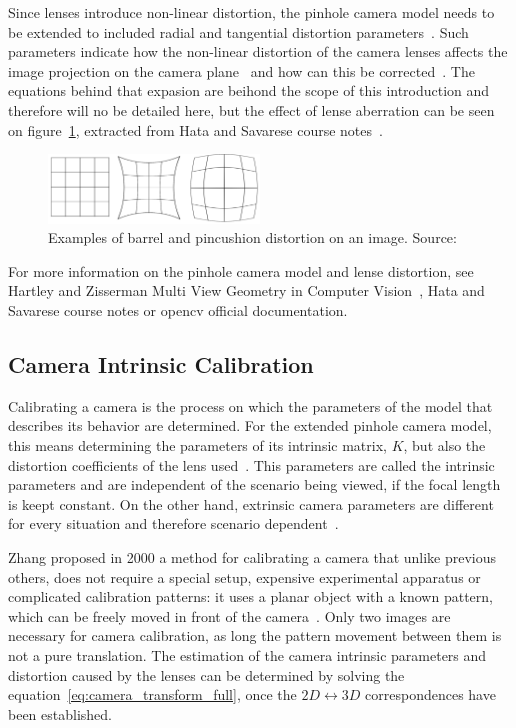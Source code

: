 Since lenses introduce non-linear distortion, the pinhole camera model needs to be extended to included radial and tangential distortion parameters~\cite{Bouguet2010, manuapphotogrammetry, Heikkila1997}. Such parameters indicate how the non-linear distortion of the camera lenses affects the image projection on the camera plane~\cite{camera_models, Sturm2010} and how can this be corrected~\cite{Heikkila1997, Bouguet2010, opencv_doc}. The equations behind that expasion are beihond the scope of this introduction and therefore will no be detailed here, but the effect of lense aberration can be seen on figure~\ref{fig:lense_distortion_types}, extracted from Hata and Savarese course notes~\cite{camera_models}.

\begin{figure}[h]
	\centering
	\includegraphics[width=0.5\textwidth]{img/camera/distortion.png}
	\caption{Examples of barrel and pincushion distortion on an image. Source: \cite{camera_models}}
	\label{fig:lense_distortion_types}
\end{figure}

For more information on the pinhole camera model and lense distortion, see Hartley and Zisserman Multi View Geometry in Computer Vision~\cite{mvg_book}, Hata and Savarese course notes\cite{camera_models} or \acf{opencv} official documentation\cite{opencv_doc}. 

\subsection{Camera Intrinsic Calibration}
Calibrating a camera is the process on which the parameters of the model that describes its behavior are determined. For the extended pinhole camera model, this means determining the parameters of its intrinsic matrix, $K$, but also the distortion coefficients of the lens used~\cite{mvg_book, camera_models, Bouguet2010, Heikkila1997}. This parameters are called the intrinsic parameters and are independent of the scenario being viewed, if the focal length is keept constant. On the other hand, extrinsic camera parameters are different for every situation and therefore scenario dependent~\cite{opencv_doc, Bouguet2010, Heikkila1997}.

Zhang proposed in 2000 a method for calibrating a camera that unlike previous others\citeneeded, does not require a special setup, expensive experimental apparatus or complicated calibration patterns: it uses a planar object with a known pattern, which can be freely moved in front of the camera~\cite{Zhang2000}. Only two images are necessary for camera calibration, as long the pattern movement between them is not a pure translation. The estimation of the camera intrinsic parameters and distortion caused by the lenses can be determined by solving the equation~\ref{eq:camera_transform_full}, once the $2D \leftrightarrow 3D$ correspondences have been established.

